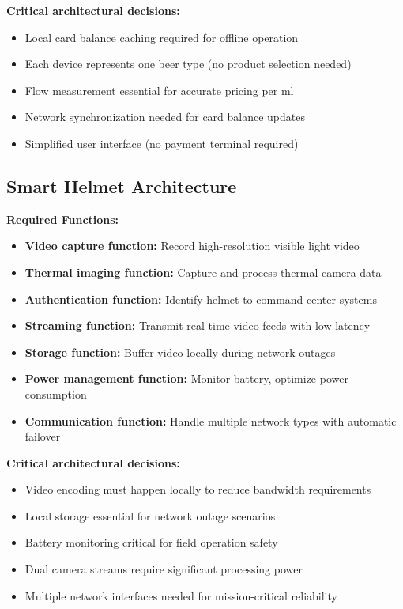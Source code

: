 \textbf{Critical architectural decisions:}
\begin{itemize}
\item Local card balance caching required for offline operation
\item Each device represents one beer type (no product selection needed)
\item Flow measurement essential for accurate pricing per ml
\item Network synchronization needed for card balance updates
\item Simplified user interface (no payment terminal required)
\end{itemize}

\subsection{Smart Helmet Architecture}

\textbf{Required Functions:}
\begin{itemize}
\item \textbf{Video capture function:} Record high-resolution visible light video
\item \textbf{Thermal imaging function:} Capture and process thermal camera data
\item \textbf{Authentication function:} Identify helmet to command center systems
\item \textbf{Streaming function:} Transmit real-time video feeds with low latency
\item \textbf{Storage function:} Buffer video locally during network outages
\item \textbf{Power management function:} Monitor battery, optimize power consumption
\item \textbf{Communication function:} Handle multiple network types with automatic failover
\end{itemize}

\textbf{Critical architectural decisions:}
\begin{itemize}
\item Video encoding must happen locally to reduce bandwidth requirements
\item Local storage essential for network outage scenarios
\item Battery monitoring critical for field operation safety
\item Dual camera streams require significant processing power
\item Multiple network interfaces needed for mission-critical reliability
\end{itemize}

